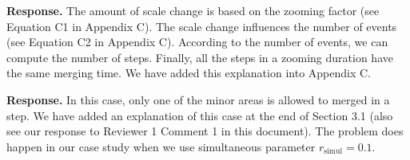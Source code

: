 \documentclass[a4paper,twoside,11pt]{reviewresponse}
\begin{document}
\textbf{Response.}
The amount of scale change is based on the zooming factor
(see Equation C1 in Appendix C).
The scale change influences the number of events
(see Equation C2 in Appendix C).
According to the number of events, 
we can compute the number of steps.
Finally, all the steps in a zooming duration 
have the same merging time.
We have added this explanation into Appendix C.



\textbf{Response.}
In this case, only one of the minor areas is allowed to merged in a step.
We have added an explanation of this case at the end of Section 3.1
(also see our response to Reviewer 1 Comment 1 in this document).
The problem does happen in our case study 
when we use simultaneous parameter $r_\mathrm{simul}=0.1$.









\printbibliography
	
\end{document}

